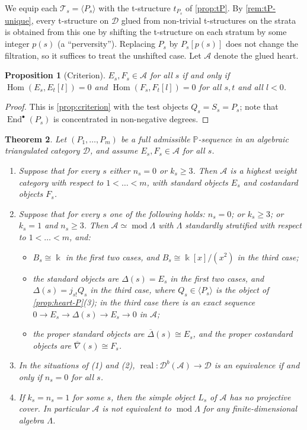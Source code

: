 \documentclass[11pt,reqno]{amsart}
\theoremstyle{plain}
\newtheorem{theorem}{Theorem}[section]
\newtheorem{proposition}[theorem]{Proposition}
\theoremstyle{definition}
\theoremstyle{remark}
\newcommand{\kk}{\Bbbk}
\DeclareMathOperator{\Hom}{Hom}
\DeclareMathOperator{\End}{End}
\DeclareMathOperator{\real}{real}
\newcommand{\modd}{\operatorname{mod}}
\newcommand{\Db}{\mathcal{D}^b}
\newcommand{\thick}[1]{\langle #1\rangle}
\newcommand{\nablabar}{\overline{\nabla}}
\newcommand{\Deltabar}{\overline{\Delta}}
\newcommand{\cD}{\mathcal{D}}
\newcommand{\cA}{\mathcal{A}}
\newcommand{\cT}{\mathcal{T}}
\begin{document}
We equip each $\cT_s=\thick{P_s}$ with the t-structure $t_{P_s}$ of \cref{prop:tP}. By \cref{rem:tP-unique}, every t-structure on $\cD$ glued from non-trivial t-structures on the strata is obtained from this one by shifting the t-structure on each stratum by some integer $p(s)$ (a ``perversity''). Replacing $P_s$ by $P_s[p(s)]$ does not change the filtration, so it suffices to treat the unshifted case. Let $\cA$ denote the glued heart.

\begin{proposition}[Criterion]\label{prop:P-criterion}
$E_s,F_s\in\cA$ for all $s$ if and only if $\Hom(E_s,E_t[l])=0$ and $\Hom(F_s,F_t[l])=0$ for all $s,t$ and all $l<0$.
\end{proposition}

\begin{proof}
This is \cref{prop:criterion} with the test objects $Q_s=S_s=P_s$; note that $\End^\bullet(P_s)$ is concentrated in non-negative degrees.
\end{proof}

\begin{theorem}\label{thm:Pseq}
Let $(P_1,\dots,P_m)$ be a full admissible $\mathbb{P}$-sequence in an algebraic triangulated category $\cD$, and assume $E_s,F_s\in\cA$ for all $s$.
\begin{enumerate}
\item Suppose that for every $s$ either $n_s=0$ or $k_s\ge3$. Then $\cA$ is a highest weight category with respect to $1<\dots<m$, with standard objects $E_s$ and costandard objects $F_s$.
\item Suppose that for every $s$ one of the following holds: $n_s=0$; or $k_s\ge3$; or $k_s=1$ and $n_s\ge3$. Then $\cA\simeq\modd\Lambda$ with $\Lambda$ standardly stratified with respect to $1<\dots<m$, and:
\begin{itemize}
\item $B_s\cong\kk$ in the first two cases, and $B_s\cong\kk[x]/(x^2)$ in the third case;
\item the standard objects are $\Delta(s)=E_s$ in the first two cases, and $\Delta(s)=j_{s!}Q_s$ in the third case, where $Q_s\in\thick{P_s}$ is the object of \cref{prop:heart-P}(3); in the third case there is an exact sequence $0\to E_s\to\Delta(s)\to E_s\to0$ in $\cA$;
\item the proper standard objects are $\Deltabar(s)\cong E_s$, and the proper costandard objects are $\nablabar(s)\cong F_s$.
\end{itemize}
\item In the situations of \textup{(1)} and \textup{(2)}, $\real\colon\Db(\cA)\to\cD$ is an equivalence if and only if $n_s=0$ for all $s$.
\item If $k_s=n_s=1$ for some $s$, then the simple object $L_s$ of $\cA$ has no projective cover. In particular $\cA$ is not equivalent to $\modd\Lambda$ for any finite-dimensional algebra $\Lambda$.
\end{enumerate}
\end{theorem}
\end{document}
